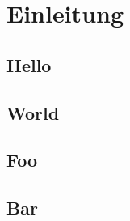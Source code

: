 \chapter{Einleitung}

    \section{Hello}
        \lipsum[1-20]
        
    \section{World}
        \lipsum[21]
        
    \section{Foo}
        

        
        
        \lipsum[21]
        
    \section{Bar}
        \lipsum[1-20]
        